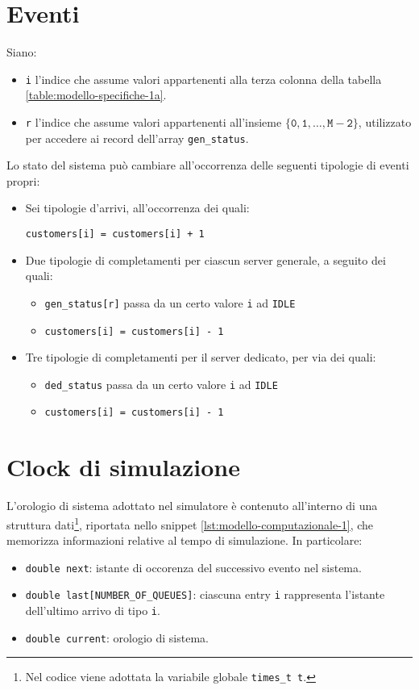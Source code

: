 \section{Eventi}\label{sec:modello-computazionale-eventi}
Siano:
\begin{itemize}
\item \texttt{i} l'indice che assume valori appartenenti alla terza colonna della tabella \ref{table:modello-specifiche-1a}.
\item \texttt{r} l'indice che assume valori appartenenti all'insieme $\mathtt{\lbrace 0, 1, \dots, M - 2 \rbrace}$, utilizzato per accedere ai record dell'array \texttt{gen\_status}.
\end{itemize}
Lo stato del sistema può cambiare all'occorrenza delle seguenti tipologie di eventi propri:
\begin{itemize}
\item Sei tipologie d'arrivi, all'occorrenza dei quali:
\begin{center}
\texttt{customers[i] = customers[i] + 1}
\end{center}
\item Due tipologie di completamenti per ciascun server generale, a seguito dei quali:
\begin{itemize}
\item \texttt{gen\_status[r]} passa da un certo valore \texttt{i} ad \texttt{IDLE}
\item \texttt{customers[i] = customers[i] - 1}
\end{itemize}
\item Tre tipologie di completamenti per il server dedicato, per via dei quali:
\begin{itemize}
\item \texttt{ded\_status} passa da un certo valore \texttt{i} ad \texttt{IDLE}
\item \texttt{customers[i] = customers[i] - 1}
\end{itemize}
\end{itemize} 
\section{Clock di simulazione}\label{sec:modello-computazionale-clock}
L'orologio di sistema adottato nel simulatore è contenuto all'interno di una struttura dati\footnote{Nel codice viene adottata la variabile globale \texttt{{\color{code_purple}times\_t} t}.}, riportata nello snippet \ref{lst:modello-computazionale-1}, che memorizza informazioni relative al tempo di simulazione. In particolare:
\begin{itemize}
\item \texttt{{\color{code_purple}double} next}: istante di occorenza del successivo evento nel sistema.
\item \texttt{{\color{code_purple}double} last[NUMBER\_OF\_QUEUES]}: ciascuna entry \texttt{i} rappresenta l'istante dell'ultimo arrivo di tipo \texttt{i}.
\item \texttt{{\color{code_purple}double} current}: orologio di sistema.
\end{itemize}

